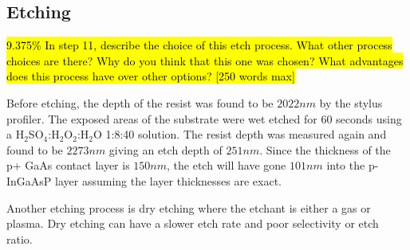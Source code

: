 \subsection{Etching}
\label{sec:fab:etching}

\hl{9.375\% In step 11, describe the choice of this etch process. What other process choices are there? Why do you think that this one was chosen? What advantages does this process have over other options? [250 words max]}

Before etching, the depth of the resist was found to be $2022nm$ by the stylus profiler. The exposed areas of the substrate were wet etched for 60 seconds using a H$_{2}$SO$_{4}$:H$_{2}$O$_{2}$:H$_{2}$O 1:8:40 solution. The resist depth was measured again and found to be $2273nm$ giving an etch depth of $251nm$. Since the thickness of the p+ GaAs contact layer is $150nm$, the etch will have gone $101nm$ into the p-InGaAsP layer assuming the layer thicknesses are exact.

Another etching process is dry etching where the etchant is either a gas or plasma. Dry etching can have a slower etch rate and poor selectivity or etch ratio.

